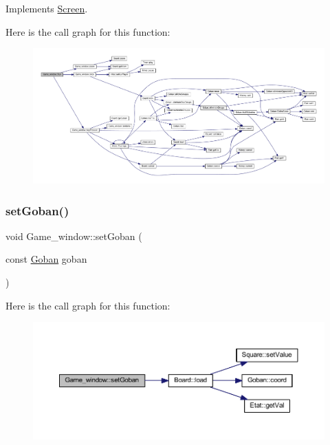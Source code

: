 Implements \hyperlink{class_screen_aadaffbe93949a54f04e2a87c5602f610}{Screen}.

Here is the call graph for this function\+:\nopagebreak
\begin{figure}[H]
\begin{center}
\leavevmode
\includegraphics[width=350pt]{class_game__window_aec21feecf4c72d73c13d82aa12df6930_cgraph}
\end{center}
\end{figure}
\mbox{\label{class_game__window_a35801adc41e40f90a36cff6db14defcd}} 
\subsubsection{\texorpdfstring{set\+Goban()}{setGoban()}}
{\footnotesize\ttfamily void Game\+\_\+window\+::set\+Goban (\begin{DoxyParamCaption}\item[{const \hyperlink{class_goban}{Goban}}]{goban }\end{DoxyParamCaption})}

Here is the call graph for this function\+:\nopagebreak
\begin{figure}[H]
\begin{center}
\leavevmode
\includegraphics[width=350pt]{class_game__window_a35801adc41e40f90a36cff6db14defcd_cgraph}
\end{center}
\end{figure}
\mbox{\label{class_game__window_a5d130eb03ee63de5d63f91bcf6c56fa5}} 
